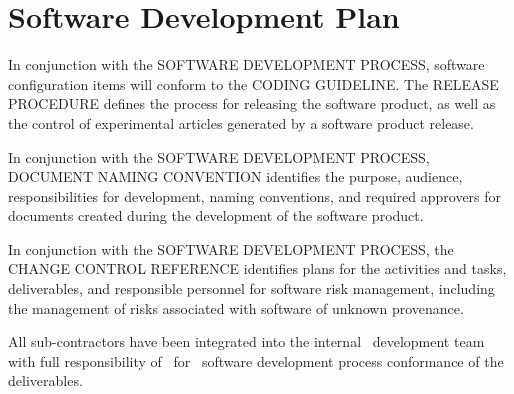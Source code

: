 \section{Software Development Plan}
In conjunction with the SOFTWARE DEVELOPMENT PROCESS, software configuration
items will conform to the CODING GUIDELINE. The RELEASE PROCEDURE defines the
process for releasing the software product, as well as the control of
experimental articles generated by a software product release.

\tlcVspace

In conjunction with the SOFTWARE DEVELOPMENT PROCESS, DOCUMENT NAMING CONVENTION
identifies the purpose, audience, responsibilities for development, naming
conventions, and required approvers for documents created during the development
of the software product.

\tlcVspace

In conjunction with the SOFTWARE DEVELOPMENT PROCESS, the CHANGE CONTROL
REFERENCE identifies plans for the activities and tasks, deliverables, and
responsible personnel for software risk management, including the management of
risks associated with software of unknown provenance.

\tlcVspace

All sub-contractors have been integrated into the internal \autodocCompanyName\
development team with full responsibility of \autodocCompanyName\ for
\autodocCompanyName\ software development process conformance of the
deliverables.
